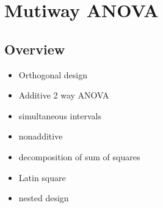 \documentclass[11pt,fleqn]{book} %
\begin{document}











\chapter{Mutiway ANOVA}

\section{Overview}

\begin{itemize}
	\item Orthogonal design
	\item Additive 2 way ANOVA
	\item simultaneous intervals
	\item nonadditive
	\item decomposition of sum of squares
	\item Latin square
	\item nested design
\end{itemize}


\end{document}
